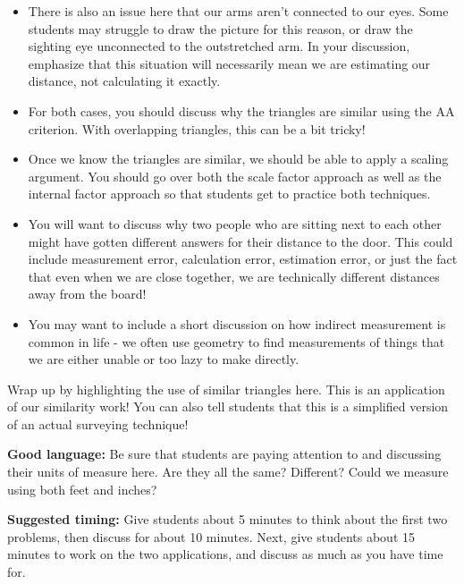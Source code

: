 \documentclass[nooutcomes,noauthor]{ximera}
\begin{document}
\begin{instructorNotes}
\begin{itemize}
	\item There is also an issue here that our arms aren't connected to our eyes. Some students may struggle to draw the picture for this reason, or draw the sighting eye unconnected to the outstretched arm. In your discussion, emphasize that this situation will necessarily mean we are estimating our distance, not calculating it exactly.
	\item For both cases, you should discuss why the triangles are similar using the AA criterion. With overlapping triangles, this can be a bit tricky!
	\item Once we know the triangles are similar, we should be able to apply a scaling argument. You should go over both the scale factor approach as well as the internal factor approach so that students get to practice both techniques.
	\item You will want to discuss why two people who are sitting next to each other might have gotten different answers for their distance to the door. This could include measurement error, calculation error, estimation error, or just the fact that even when we are close together, we are technically different distances away from the board!
	\item You may want to include a short discussion on how indirect measurement is common in life - we often use geometry to find measurements of things that we are either unable or too lazy to make directly.
\end{itemize}

Wrap up by highlighting the use of similar triangles here. This is an application of our similarity work! You can also tell students that this is a simplified version of an actual surveying technique!



{\bf Good language:} Be sure that students are paying attention to and discussing their units of measure here. Are they all the same? Different? Could we measure using both feet and inches?



{\bf Suggested timing:} Give students about 5 minutes to think about the first two problems, then discuss for about 10 minutes. Next, give students about 15 minutes to work on the two applications, and discuss as much as you have time for.




\end{instructorNotes}
\end{document}
